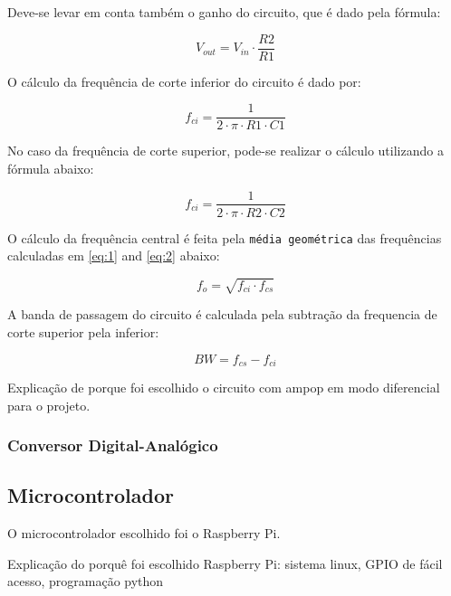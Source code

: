 	Deve-se levar em conta também o ganho do circuito, que é dado pela fórmula:
	
	\begin{equation}
	V_{out} = V_{in} \cdot \frac{R2}{R1}
	\end{equation}
	
	O cálculo da frequência de corte inferior do circuito é dado por: 
	
	\begin{equation} \label{eq:1}
	f_{ci} = \frac{1}{2 \cdot \pi \cdot R1 \cdot C1}
	\end{equation}
	
	No caso da frequência de corte superior, pode-se realizar o cálculo utilizando a fórmula abaixo:
	
	\begin{equation} \label{eq:2}
	f_{ci} = \frac{1}{2 \cdot \pi \cdot R2 \cdot C2}
	\end{equation}
	
	O cálculo da frequência central é feita pela \texttt{média geométrica} das frequências calculadas em \ref{eq:1} and \ref{eq:2} abaixo: 
	
	\begin{equation} \label{eq:3}
	f_{o} = \sqrt{f_{ci} \cdot f_{cs}}
	\end{equation}
	
	A banda de passagem do circuito é calculada pela subtração da frequencia de corte superior pela inferior:
	
	\begin{equation} \label{eq:4}
	BW = f_{cs} - f_{ci}
	\end{equation}
	
	Explicação de porque foi escolhido o circuito com ampop em modo diferencial para o projeto.
	
	\subsubsection{Conversor Digital-Analógico}
	
	\subsection{Microcontrolador}\label{hard-uc}
	
	O microcontrolador escolhido foi o Raspberry Pi.

	
	Explicação do porquê foi escolhido Raspberry Pi: sistema linux, GPIO de fácil acesso, programação python
	
